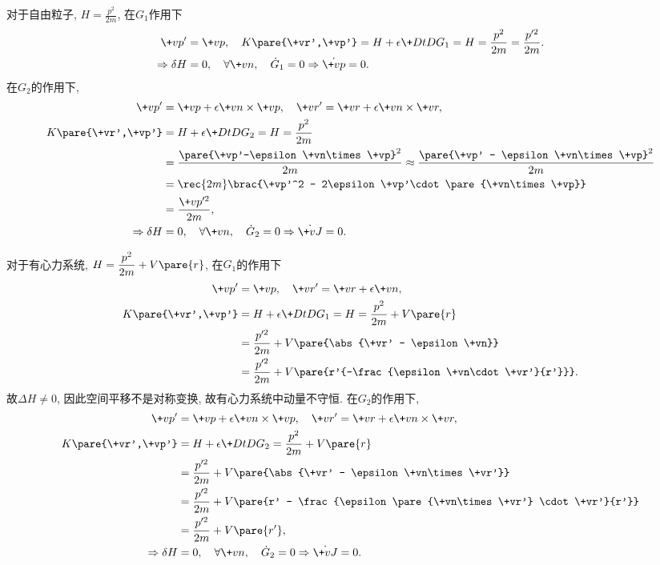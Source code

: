 \documentclass[../LectureNotes.tex]{subfiles}
\begin{document}
\begin{sample}
    \begin{ex}
        对于自由粒子, $\displaystyle H = \frac{p^2}{2m}$, 在$G_1$作用下
        \begin{align*}
            \+vp' &= \+vp,\quad K\pare{\+vr',\+vp'} = H + \epsilon \+DtD{G_1} = H = \frac{p^2}{2m} = \frac{p'^2}{2m}. \\
            \Rightarrow \delta H &= 0,\quad \forall \+vn,\quad \dot{G}_1 = 0 
            \Rightarrow \dot{\+vp} = 0.
        \end{align*}
        在$G_2$的作用下,
        \begin{align*}
            \+vp' &= \+vp + \epsilon \+vn\times\+vp,\quad \+vr' = \+vr + \epsilon\+vn\times\+vr, \\
            K\pare{\+vr',\+vp'} &= H + \epsilon\+DtD{G_2} = H = \frac{p^2}{2m} \\
            &= \frac{\pare{\+vp'-\epsilon\+vn\times\+vp}^2}{2m} \approx \frac{\pare{\+vp' - \epsilon\+vn\times\+vp}^2}{2m} \\
            &= \rec{2m} \brac{\+vp'^2 - 2\epsilon \+vp'\cdot\pare{\+vn\times \+vp}} \\
            &= \frac{\+vp'^2}{2m}, \\
            \Rightarrow \delta H &= 0,\quad \forall \+vn,\quad \dot{G}_2 = 0 \Rightarrow \dot{\+vJ} = 0.
        \end{align*}
    \end{ex}
\end{sample}
\begin{sample}
    \begin{ex}
        对于有心力系统, $\displaystyle H = \frac{p^2}{2m} + V\pare{r}$, 在$G_1$的作用下
        \begin{align*}
            \+vp' &= \+vp,\quad \+vr' = \+vr + \epsilon\+vn, \\
            K\pare{\+vr',\+vp'} &= H + \epsilon \+DtD{G_1} = H = \frac{p^2}{2m} + V\pare{r} \\
            &= \frac{p'^2}{2m} + V\pare{\abs{\+vr' - \epsilon \+vn}} \\
            &= \frac{p'^2}{2m} + V\pare{r'{-\frac{\epsilon\+vn\cdot \+vr'}{r'}}}.
        \end{align*}
        故$\Delta H \neq 0$, 因此空间平移不是对称变换, 故有心力系统中动量不守恒. 在$G_2$的作用下,
        \begin{align*}
            \+vp' &= \+vp + \epsilon \+vn\times\+vp,\quad \+vr' = \+vr + \epsilon\+vn\times\+vr, \\
            K\pare{\+vr',\+vp'} &= H + \epsilon \+DtD{G_2} = \frac{p^2}{2m} + V\pare{r} \\
            &= \frac{p'^2}{2m} + V\pare{\abs{\+vr' - \epsilon \+vn\times \+vr'}} \\
            &= \frac{p'^2}{2m} + V\pare{r' - \frac{\epsilon \pare{\+vn\times \+vr'} \cdot \+vr'}{r'}} \\
            &= \frac{p'^2}{2m} + V\pare{r'}, \\
            \Rightarrow \delta H &= 0,\quad \forall \+vn,\quad \dot{G}_2 = 0\Rightarrow \dot{\+vJ} = 0.
        \end{align*}
    \end{ex}
\end{sample}
\end{document}
